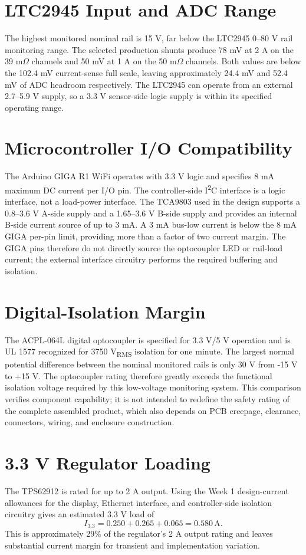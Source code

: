 \section{LTC2945 Input and ADC Range}
The highest monitored nominal rail is 15 V, far below the LTC2945 0--80 V rail
monitoring range. The selected production shunts produce 78 mV at 2 A on the
39 m\(\Omega\) channels and 50 mV at 1 A on the 50 m\(\Omega\) channels. Both
values are below the 102.4 mV current-sense full scale, leaving approximately
24.4 mV and 52.4 mV of ADC headroom respectively. The LTC2945 can operate from
an external 2.7--5.9 V supply, so a 3.3 V sensor-side logic supply is within its
specified operating range.

\section{Microcontroller I/O Compatibility}
The Arduino GIGA R1 WiFi operates with 3.3 V logic and specifies 8 mA maximum DC
current per I/O pin. The controller-side I\textsuperscript{2}C interface is a
logic interface, not a load-power interface. The TCA9803 used in the design
supports a 0.8--3.6 V A-side supply and a 1.65--3.6 V B-side supply and provides
an internal B-side current source of up to 3 mA. A 3 mA bus-low current is below
the 8 mA GIGA per-pin limit, providing more than a factor of two current margin.
The GIGA pins therefore do not directly source the optocoupler LED or rail-load
current; the external interface circuitry performs the required buffering and
isolation.

\section{Digital-Isolation Margin}
The ACPL-064L digital optocoupler is specified for 3.3 V/5 V operation and is
UL 1577 recognized for 3750 V\textsubscript{RMS} isolation for one minute. The
largest normal potential difference between the nominal monitored rails is only
30 V from -15 V to +15 V. The optocoupler rating therefore greatly exceeds the
functional isolation voltage required by this low-voltage monitoring system.
This comparison verifies component capability; it is not intended to redefine
the safety rating of the complete assembled product, which also depends on PCB
creepage, clearance, connectors, wiring, and enclosure construction.

\section{3.3 V Regulator Loading}
The TPS62912 is rated for up to 2 A output. Using the Week 1 design-current
allowances for the display, Ethernet interface, and controller-side isolation
circuitry gives an estimated 3.3 V load of
\begin{equation}
    I_{3.3}=0.250+0.265+0.065=0.580\,\mathrm{A}.
\end{equation}
This is approximately 29\% of the regulator's 2 A output rating and leaves
substantial current margin for transient and implementation variation.

